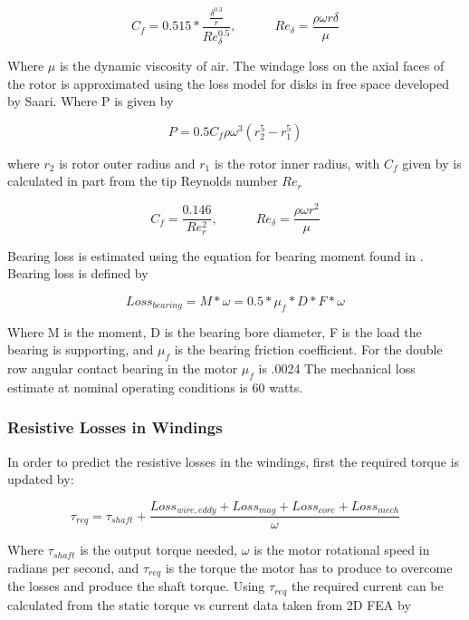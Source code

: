 \documentclass[]{aiaa-tc}%
\begin{document}
\begin{equation}
C_{f}= 0.515*\frac{\frac{\delta^{0.3}}{r}}{Re_{\delta}^{0.5}} , \quad \quad \quad Re_{\delta}=\frac{\rho\omega r \delta}{\mu}
\label{eq:Cf}
\end{equation}

Where $\mu$ is the dynamic viscosity of air. 
The windage loss on the axial faces of the rotor is approximated using the loss model for disks in free space developed by Saari.\cite{Saari} Where P is given by 

\begin{equation}
P =0.5C_{f}\rho\omega^{3}(r_{2}^{5}-r_{1}^{5})
\label{eq:AxialWindage}
\end{equation}

where $r_{2}$ is rotor outer radius and $r_{1}$ is the rotor inner radius, with $C_{f}$ given by is calculated in part from the tip Reynolds number $Re_{r}$

\begin{equation}
C_{f}= \frac{0.146}{Re_{r}^{2}}, \quad \quad \quad
Re_{\delta}=\frac{\rho\omega r^{2}}{\mu}
\label{eq:Cf2}
\end{equation}

Bearing loss is estimated using the equation for bearing moment found in \cite{Krings}. Bearing loss is defined by

\begin{equation}
Loss_{bearing} = M*\omega = 0.5*\mu_{f}*D*F*\omega
\label{eq:BearingLoss}
\end{equation}

Where M is the moment, D is the bearing bore diameter, F is the load the bearing is supporting, and $\mu_{f}$ is the bearing friction coefficient. For the double row angular contact bearing in the motor $\mu_{f}$ is .0024  The mechanical loss estimate at nominal operating conditions is 60 watts.


\subsubsection{Resistive Losses in Windings}
In order to predict the resistive losses in the windings, first the required torque is updated by:

\begin{equation}
\tau_{req} = \tau_{shaft} + \frac{Loss_{wire,eddy} + Loss_{mag} +Loss_{core} +Loss_{mech}}{\omega}
\label{eq:TotalLoss}
\end{equation}

Where $\tau_{shaft}$ is the output torque needed, $\omega$ is the motor rotational speed in radians per second, and $\tau_{req}$ is the torque the motor has to produce to overcome the losses and produce the shaft torque. Using $\tau_{req}$ the required current can be calculated from the static torque vs current data taken from 2D FEA by
\end{document}
